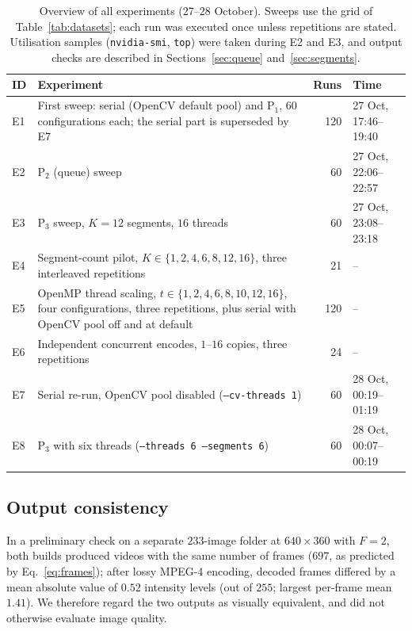 \documentclass[conference]{IEEEtran}
\begin{document}
\begin{table}[t]
\caption{Overview of all experiments (27--28 October). Sweeps use the grid of Table~\ref{tab:datasets}; each run was executed once unless repetitions are stated. Utilisation samples (\texttt{nvidia-smi}, \texttt{top}) were taken during E2 and E3, and output checks are described in Sections~\ref{sec:queue} and~\ref{sec:segments}.}
\label{tab:experiments}
\centering
\footnotesize
\begin{tabular}{@{}lp{}rl@{}}
\toprule
ID & Experiment & Runs & Time \\
\midrule
E1 & First sweep: serial (OpenCV default pool) and P$_1$, $60$ configurations each; the serial part is superseded by E7 & 120 & 27 Oct, 17:46--19:40 \\
E2 & P$_2$ (queue) sweep & 60 & 27 Oct, 22:06--22:57 \\
E3 & P$_3$ sweep, $K{=}12$ segments, $16$ threads & 60 & 27 Oct, 23:08--23:18 \\
E4 & Segment-count pilot, $K\in\{1,2,4,6,8,12,16\}$, three interleaved repetitions & 21 & -- \\
E5 & OpenMP thread scaling, $t\in\{1,2,4,6,8,10,12,16\}$, four configurations, three repetitions, plus serial with OpenCV pool off and at default & 120 & -- \\
E6 & Independent concurrent encodes, $1$--$16$ copies, three repetitions & 24 & -- \\
E7 & Serial re-run, OpenCV pool disabled (\texttt{--cv-threads 1}) & 60 & 28 Oct, 00:19--01:19 \\
E8 & P$_3$ with six threads (\texttt{--threads 6 --segments 6}) & 60 & 28 Oct, 00:07--00:19 \\
\bottomrule
\end{tabular}
\end{table}

\subsection{Output consistency}
In a preliminary check on a separate $233$-image folder at $640\times360$ with $F{=}2$, both builds produced videos with the same number of frames ($697$, as predicted by Eq.~\eqref{eq:frames}); after lossy MPEG-4 encoding, decoded frames differed by a mean absolute value of $0.52$ intensity levels (out of $255$; largest per-frame mean $1.41$). We therefore regard the two outputs as visually equivalent, and did not otherwise evaluate image quality.
\end{document}
